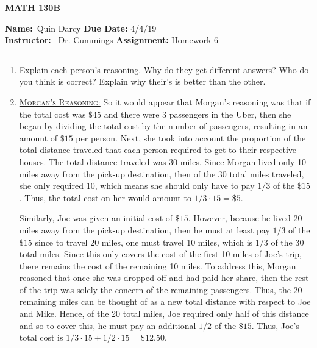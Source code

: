 \documentclass[12pt]{article}
\makeatletter
\theoremstyle{definition}
\theoremstyle{remark}
\newenvironment{solution}[1][\bf{\textit{Solution}}]{\par
  
  \normalfont \topsep6\p@\@plus6\p@\relax
  \list{}{\leftmargin=0mm
          \rightmargin=0mm
          \settowidth{\itemindent}{\itshape#1}%
          \labelwidth=\itemindent
          \parsep=0pt \listparindent=\parindent 
  }
  \item[\hskip\labelsep
        \itshape
    #1\@addpunct{.}]\ignorespaces
}{%
  \popQED\endlist\@endpefalse
}
\makeatother
\begin{document}
\begin{center}
	\vspace{.4cm} {\textbf { \large MATH 130B}}
\end{center}
{\textbf{Name:}\ Quin Darcy \hspace{\fill} \textbf{Due Date:} 4/4/19   \\
{ \textbf{Instructor:}} \ Dr. Cummings \hspace{\fill} \textbf{Assignment:} Homework 6 \\ \hrule}

\justifying


\begin{enumerate}[leftmargin=*]

    \item Explain each person's reasoning. Why do they get different answers? Who do you think is correct? Explain why their's is better than the other.
    
        \begin{solution}\hfill\par\vspace{4mm}\underline{\textsc{Morgan's Reasoning:}}
            So it would appear that Morgan's reasoning was that if the total cost was $\$ 45$ and there were 3 passengers in the Uber, then she began by dividing the total cost by the number of passengers, resulting in an amount of $\$ 15$ per person. Next, she took into account the proportion of the total distance traveled that each person required to get to their respective houses. The total distance traveled was 30 miles. Since Morgan lived only 10 miles away from the pick-up destination, then of the 30 total miles traveled, she only required 10, which means she should only have to pay $1/3$ of the $\$ 15$. Thus, the total cost on her would amount to $1/3\cdot 15=\$ 5$.\par
            
            \hspace{4mm} Similarly, Joe was given an initial cost of $\$15$. However, because he lived 20 miles away from the pick-up destination, then he must at least pay $1/3$ of the $\$ 15$ since to travel 20 miles, one must travel 10 miles, which is $1/3$ of the 30 total miles. Since this only covers the cost of the first 10 miles of Joe's trip, there remains the cost of the remaining 10 miles. To address this, Morgan reasoned that once she was dropped off and had paid her share, then the rest of the trip was solely the concern of the remaining passengers. Thus, the 20 remaining miles can be thought of as a new total distance with respect to Joe and Mike. Hence, of the 20 total miles, Joe required only half of this distance and so to cover this, he must pay an additional $1/2$ of the $\$ 15$. Thus, Joe's total cost is $1/3\cdot 15+1/2\cdot 15=\$12.50$.\par
            

\end{solution}
\end{enumerate}
\end{document}
